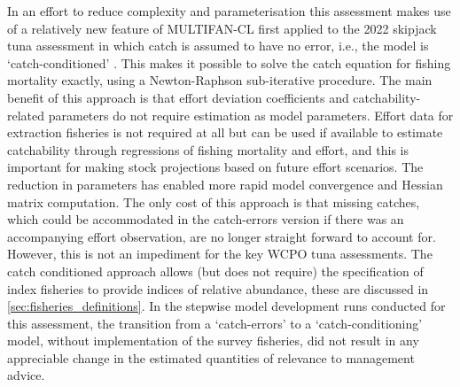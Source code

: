 In an effort to reduce complexity and parameterisation this assessment makes use of a relatively new feature of MULTIFAN-CL first applied to the 2022 skipjack tuna assessment in which catch is assumed to have no error, i.e., the model is `catch-conditioned' \citep{davies_developments_2022}. This makes it possible to solve the catch equation for fishing mortality exactly, using a Newton-Raphson sub-iterative procedure. The main benefit of this approach is that effort deviation coefficients and catchability-related parameters do not require estimation as model parameters. Effort data for extraction fisheries is not required at all but can be used if available to estimate catchability through regressions of fishing mortality and effort, and this is important for making stock projections based on future effort scenarios. The reduction in parameters has enabled more rapid model convergence and Hessian matrix computation. The only cost of this approach is that missing catches, which could be accommodated in the catch-errors version if there was an accompanying effort observation, are no longer straight forward to account for. However, this is not an impediment for the key WCPO tuna assessments. The catch conditioned approach allows (but does not require) the specification of index fisheries to provide indices of relative abundance, these are discussed in \autoref{sec:fisheries_definitions}. In the stepwise model development runs conducted for this assessment, the transition from a `catch-errors' to a `catch-conditioning' model, without implementation of the survey fisheries, did not result in any appreciable change in the estimated quantities of relevance to management advice.
